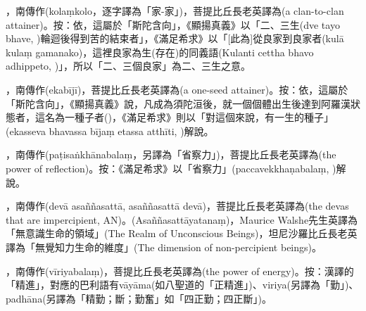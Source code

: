 \startitemgroup[noteitems]
\item{}，南傳作(kolaṃkolo，逐字譯為「家-家」)，菩提比丘長老英譯為(a clan-to-clan attainer)。按：依，這屬於「斯陀含向」，《顯揚真義》以「二、三生(dve tayo bhave, )輪迴後得到苦的結束者」，《滿足希求》以「[此為]從良家到良家者(kulā kulaṃ gamanako)，這裡良家為生(存在)的同義語(Kulanti cettha bhavo adhippeto, )」，所以「二、三個良家」為二、三生之意。
\stopitemgroup

\startitemgroup[noteitems]
\item{}，南傳作(ekabījī)，菩提比丘長老英譯為(a one-seed attainer)。按：依，這屬於「斯陀含向」，《顯揚真義》說，凡成為須陀洹後，就一個個體出生後達到阿羅漢狀態者，這名為一種子者()，《滿足希求》則以「對這個來說，有一生的種子」(ekasseva bhavassa bījaṃ etassa atthīti, )解說。
\stopitemgroup

\startitemgroup[noteitems]
\item{}，南傳作(paṭisaṅkhānabalaṃ，另譯為「省察力」)，菩提比丘長老英譯為(the power of reflection)。按：《滿足希求》以「省察力」(paccavekkhaṇabalaṃ, )解說。
\stopitemgroup

\startitemgroup[noteitems]
\item{}，南傳作(devā asaññasattā, asaññasattā devā)，菩提比丘長老英譯為(the devas that are impercipient, AN)。(Asaññasattāyatanaṃ)，Maurice Walshe先生英譯為「無意識生命的領域」(The Realm of Unconscious Beings)，坦尼沙羅比丘長老英譯為「無覺知力生命的維度」(The dimension of non-percipient beings)。
\stopitemgroup

\startitemgroup[noteitems]
\item{}，南傳作(vīriyabalaṃ)，菩提比丘長老英譯為(the power of energy)。按：漢譯的「精進」，對應的巴利語有vāyāma(如八聖道的「正精進」)、viriya(另譯為「勤」)、padhāna(另譯為「精勤；斷；勤奮」如「四正勤；四正斷」)。
\stopitemgroup

